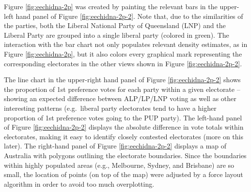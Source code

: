 \documentclass[12pt,]{article}
\theoremstyle{definition}
\theoremstyle{definition}
\theoremstyle{remark}
\begin{document}
Figure \ref{fig:eechidna-2p} was created by painting the relevant bars
in the upper-left hand panel of Figure \ref{fig:eechidna-2p-2}. Note
that, due to the similarities of the parties, both the Liberal National
Party of Queensland (LNP) and the Liberal Party are grouped into a
single liberal party (colored in green). The interaction with the bar
chart not only populates relevant density estimates, as in Figure
\ref{fig:eechidna-2p}, but it also colors every graphical mark
representing the corresponding electorates in the other views shown in
Figure \ref{fig:eechidna-2p-2}.

The line chart in the upper-right hand panel of Figure
\ref{fig:eechidna-2p-2} shows the proportion of 1st preference votes for
each party within a given electorate -- showing an expected difference
between ALP/LP/LNP voting as well as other interesting patterns
(e.g.~liberal party electorates tend to have a higher proportion of 1st
preference votes going to the PUP party). The left-hand panel of Figure
\ref{fig:eechidna-2p-2} displays the absolute difference in vote totals
within electorates, making it easy to identify closely contested
electorates (more on this later). The right-hand panel of Figure
\ref{fig:eechidna-2p-2} displays a map of Australia with polygons
outlining the electorate boundaries. Since the boundaries within highly
populated areas (e.g., Melbourne, Sydney, and Brisbane) are so small,
the location of points (on top of the map) were adjusted by a force
layout algorithm in order to avoid too much overplotting.
\end{document}
